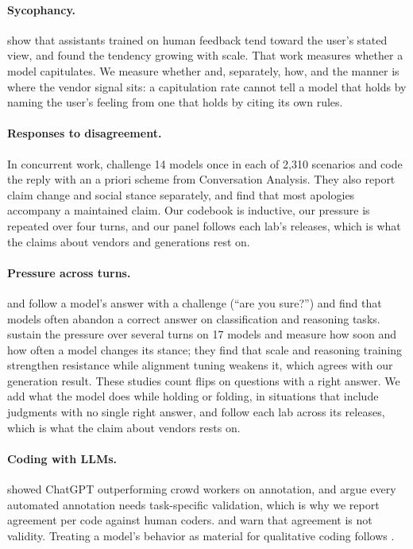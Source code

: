 \paragraph{Sycophancy.} \citet{sharma2023sycophancy} show that assistants trained on human feedback tend toward the
user's stated view, and \citet{perez2022discovering} found the tendency growing with scale. That
work measures whether a model capitulates. We measure whether and, separately, how, and the
manner is where the vendor signal sits: a capitulation rate cannot tell a model that holds by
naming the user's feeling from one that holds by citing its own rules.

\paragraph{Responses to disagreement.} In concurrent work, \citet{alnasser2026epistemic} challenge
14 models once in each of 2,310 scenarios and code the reply with an a priori scheme from
Conversation Analysis. They also report claim change and social stance separately, and find that
most apologies accompany a maintained claim. Our codebook is inductive, our pressure is repeated
over four turns, and our panel follows each lab's releases, which is what the claims about vendors
and generations rest on.

\paragraph{Pressure across turns.} \citet{laban2023flipflop} and \citet{xie2024askagain} follow a
model's answer with a challenge (``are you sure?'') and find that models often abandon a correct
answer on classification and reasoning tasks. \citet{hong2025sycon} sustain the pressure over
several turns on 17 models and measure how soon and how often a model changes its stance; they find
that scale and reasoning training strengthen resistance while alignment tuning weakens it, which
agrees with our generation result. These studies count flips on questions with a right answer. We
add what the model does while holding or folding, in situations that include judgments with no single right answer,
and follow each lab across its releases, which is what the claim about vendors rests on.

\paragraph{Coding with LLMs.} \citet{gilardi2023chatgpt} showed ChatGPT outperforming crowd
workers on annotation, and \citet{pangakis2023validation} argue every automated annotation needs
task-specific validation, which is why we report agreement per code against human coders.
\citet{norman2026reliability} and \citet{liu2026agreement} warn that agreement is not validity.
Treating a model's behavior as material for qualitative coding follows
\citet{jarrahi2025interviewing}.

